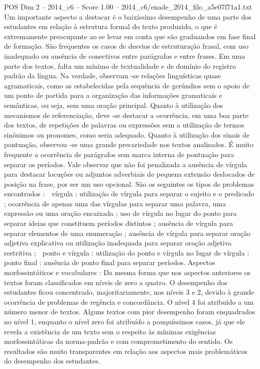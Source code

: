 \begin{textsample}{POS Dim 2 – 2014\_c6 – Score 1.00 – 2014\_c6/enade\_2014\_filo\_a5e07f71a1.txt}
Um importante aspecto a destacar é o baixíssimo desempenho de uma parte dos estudantes em relação à estrutura formal do texto produzido, o que é extremamente preocupante ao se levar em conta que são graduandos em fase final de formação.
São frequentes os casos de desvios de estruturação frasal, com uso inadequado ou ausência de conectivos entre parágrafos e entre frases.
Em uma parte dos textos, falta um mínimo de textualidade e de domínio do registro padrão da língua.
Na verdade, observam -se relações linguísticas quase agramaticais, como as estabelecidas pela sequência de gerúndios sem o apoio de um ponto de partida para a organização das informações gramaticais e semânticas, ou seja, sem uma oração principal.
Quanto à utilização dos mecanismos de referenciação, deve -se destacar a ocorrência, em uma boa parte dos textos, de repetições de palavras ou expressões sem a utilização de termos sinônimos ou pronomes, como seria adequado.
Quanto à utilização dos sinais de pontuação, observou -se uma grande precariedade nos textos analisados.
É muito frequente a ocorrência de parágrafos sem marca interna de pontuação para separar os períodos.
Vale observar que não foi penalizada a ausência de vírgula para destacar locuções ou adjuntos adverbiais de pequena extensão deslocados de posição na frase, por ser um uso opcional.
São os seguintes os tipos de problemas encontrados :  vírgula : utilização de vírgula para separar o sujeito e o predicado ; ocorrência de apenas uma das vírgulas para separar uma palavra, uma expressão ou uma oração encaixada ; uso de vírgula no lugar do ponto para separar ideias que constituem períodos distintos ; ausência de vírgula para separar elementos de uma enumeração ; ausência de vírgula para separar oração adjetiva explicativa ou utilização inadequada para separar oração adjetiva restritiva ;  ponto e vírgula : utilização do ponto e vírgula no lugar de vírgula ;  ponto final : ausência de ponto final para separar períodos.
Aspectos morfossintáticos e vocabulares : Da mesma forma que nos aspectos anteriores os textos foram classificados em níveis de zero a quatro.
O desempenho dos estudantes ficou concentrado, majoritariamente, nos níveis 3 e 2, devido à grande ocorrência de problemas de regência e concordância.
O nível 4 foi atribuído a um número menor de textos.
Alguns textos com pior desempenho foram enquadrados no nível 1, enquanto o nível zero foi atribuído a pouquíssimos casos, já que ele revela a existência de um texto sem o respeito às mínimas exigências morfossintáticas da norma-padrão e com comprometimento do sentido.
Os resultados são muito transparentes em relação aos aspectos mais problemáticos do desempenho dos estudantes.

\end{textsample}
